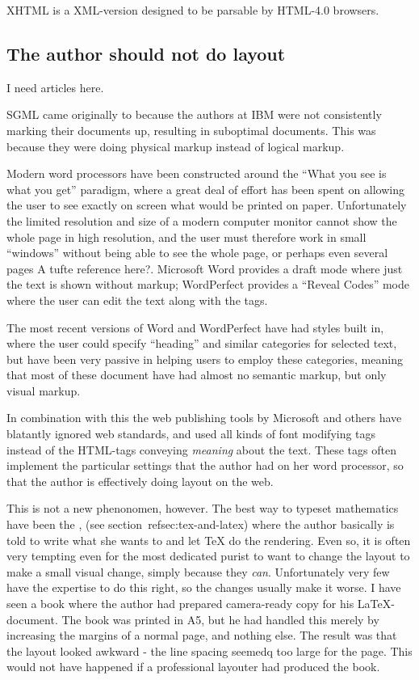 XHTML is a XML-version designed to be parsable by HTML-4.0 browsers.


\subsection{The author should not do layout}

\textsf{I need articles here.}

SGML came originally to because the authors at IBM were not
consistently marking their documents up, resulting in suboptimal
documents.  This was because they were doing physical markup instead
of logical markup.

Modern word processors have been constructed around the ``What you see
is what you get'' paradigm, where a great deal of effort has been
spent on allowing the user to see exactly on screen what would be
printed on paper.   Unfortunately the limited resolution and size of a modern
computer monitor cannot show the whole page in high resolution, and
the user must therefore work in small ``windows'' without being able
to see the whole page, or perhaps even several pages \textsf{A tufte
  reference here?}.  Microsoft Word provides a draft mode where just
the text is shown without markup;  WordPerfect provides a ``Reveal
Codes'' mode where the user can edit the text along with the tags.

The most recent versions of Word and WordPerfect have had styles built
in, where the user could specify ``heading'' and similar categories
for selected text, but have been very passive in helping users to
employ these categories, meaning that most of these
document have had almost no semantic markup, but only visual markup.

In combination with this the web publishing tools by Microsoft and
others have blatantly ignored web standards, and used all kinds of
font modifying tags instead of the HTML-tags conveying \textit{meaning}
about the text.  These tags often implement the particular settings
that the author had on her word processor, so that the author is
effectively doing layout on the web.

This is not a new phenonomen, however.  The best way to typeset
mathematics have been the , (see section~\textsf{ref{sec:tex-and-latex}}) where the
author basically is told to write what she wants to and let {TeX} do
the rendering.  Even so, it is often very tempting even for the most
dedicated purist to want to change the layout to make a small visual
change, simply because they \textit{can}.  Unfortunately very few have
the expertise to do this right, so the changes usually make it worse.
I have seen a book where the author had prepared camera-ready copy for
his {\LaTeX}-document.  The book was printed in A5, but he had handled
this merely by increasing the margins of a normal page, and nothing
else.  The result was that the layout looked awkward - the line
spacing seemedq too large for the page.  This would not have happened
if a professional layouter had produced the book.

